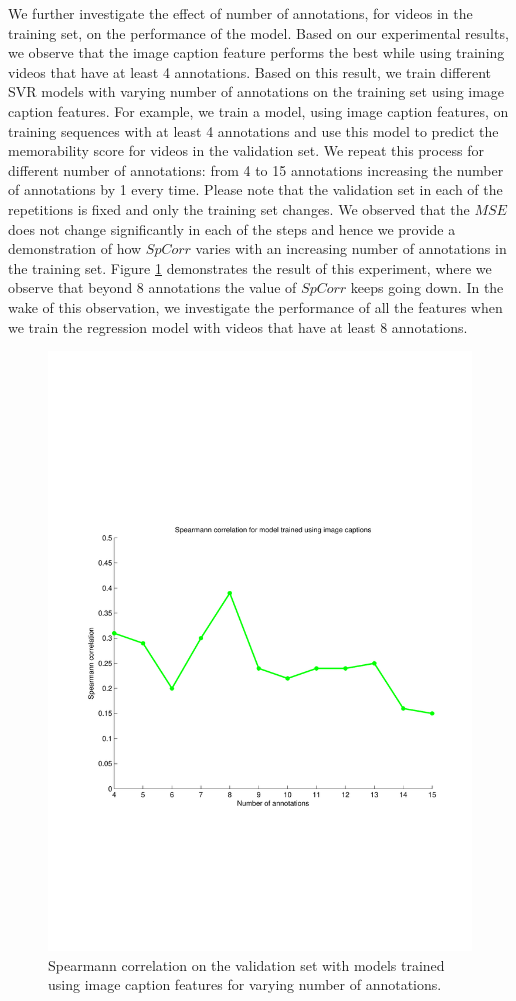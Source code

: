 \documentclass[sigconf]{acmart}
\begin{document}
We further investigate the effect of number of annotations, for videos in the training set, on the performance of the model.
Based on our experimental results, we observe that the image caption feature performs the best while using training videos that have at least 4 annotations.
Based on this result, we train different SVR models with varying number of annotations on the training set using image caption features.
For example, we train a model, using image caption features, on training sequences with at least 4 annotations and use this model to predict the memorability score for videos in the validation set.
We repeat this process for different number of annotations: from 4 to 15 annotations increasing the number of annotations by 1 every time.
Please note that the validation set in each of the repetitions is fixed and only the training set changes.
We observed that the $MSE$ does not change significantly in each of the steps and hence we provide a demonstration of how $SpCorr$ varies with an increasing number of annotations in the training set.
Figure \ref{num-ann} demonstrates the result of this experiment, where we observe that beyond 8 annotations the value of $SpCorr$ keeps going down.
In the wake of this observation, we investigate the performance of all the features when we train the regression model with videos that have at least 8 annotations.

\begin{figure}[h]	  
  \centering
    \includegraphics[width=0.7\columnwidth]{figures/annotations.pdf}
		\caption{Spearmann correlation on the validation set with models trained using image caption features for varying number of annotations.}
    \label{num-ann}
\end{figure}
\end{document}
